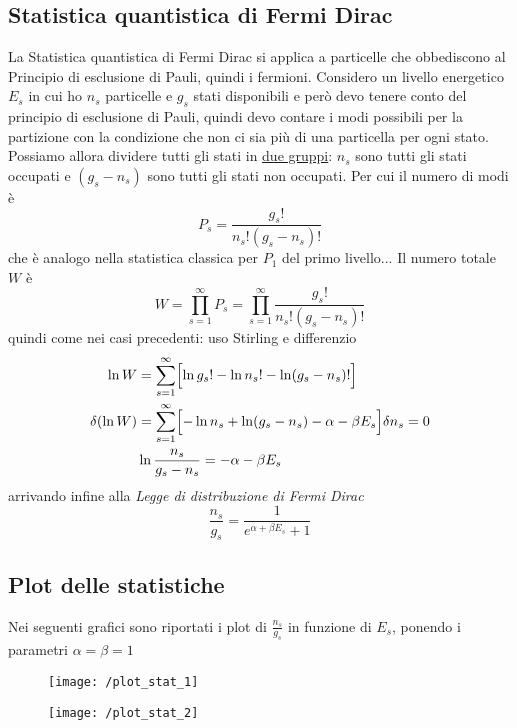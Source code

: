 \subsection{Statistica quantistica di Fermi Dirac}
La Statistica quantistica di Fermi Dirac si applica a particelle che obbediscono al Principio di esclusione di Pauli, quindi i fermioni.
Considero un livello energetico $E_s$ in cui ho $n_s$ particelle e $g_s$ stati disponibili e però devo tenere conto del principio di esclusione di Pauli, quindi devo contare i modi possibili per la partizione con la condizione che non ci sia più di una particella per ogni stato.
Possiamo allora dividere tutti gli stati in \underline{due gruppi}: $n_s$ sono tutti gli stati occupati e $(g_s - n_s)$ sono tutti gli stati non occupati.
Per cui il numero di modi è
\begin{equation}
P_s = \frac{ g_s !}{n_s! (g_s - n_s)! }
\end{equation}
che è analogo nella statistica classica per $P_1$ del primo livello...
Il numero totale $W$ è
\begin{equation}
W = \prod_{s=1}^{\infty} P_s = \prod_{s=1}^{\infty} \frac{ g_s !}{n_s! (g_s - n_s)! }
\end{equation}
quindi come nei casi precedenti: uso Stirling e differenzio
\begin{equation}
\begin{split}
\ln W & = \sum _{s=1}^{\infty} \Bigl[  \ln g_s! - \ln n_s! - \ln (g_s -n_s)!  \Bigr] \\
\delta (\ln W) & = \sum _{s=1}^{\infty} \Bigl[  - \ln n_s + \ln (g_s - n_s) - \alpha - \beta E_s  \Bigr] \delta n_s = 0 \\
& \ln \frac{ n_s}{g_s - n_s } = - \alpha - \beta E_s
\end{split}
\end{equation}
arrivando infine alla \textit{Legge di distribuzione di Fermi Dirac}
\begin{equation}
\frac{ n_s}{g_s } = \frac{ 1}{e^{ \alpha + \beta E_s } + 1 }
\end{equation}


\subsection{Plot delle statistiche}
Nei seguenti grafici sono riportati i plot di $\frac{ n_s}{g_s }$ in funzione di $E_s$, ponendo i parametri $\alpha=\beta=1$
\begin{figure}[h]
\centering
\texttt{[image: /plot\_stat\_1]}
\end{figure}
\begin{figure}[h]
\centering
\texttt{[image: /plot\_stat\_2]}
\end{figure}


